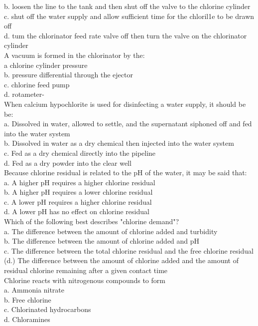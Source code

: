 b.	loosen the line to the tank and then shut off the valve to the chlorine cylinder\\
c.	shut off the water supply and allow sufficient time for the chloril1e to be drawn off\\
d.	tum the chlorinator feed rate valve off then turn the valve on the chlorinator cylinder\\
A vacuum is formed in the chlorinator by the:\\
a	chlorine cylinder pressure\\
b.	pressure differential through the ejector\\
c.	chlorine feed pump\\
d.	rotameter-\\
When calcium hypochlorite is used for disinfecting a water supply, it should be be:\\
a. Dissolved in water, allowed to settle, and the supernatant siphoned off and fed into the water system\\
b. Dissolved in water as a dry chemical then injected into the water system\\
c. Fed as a dry chemical directly into the pipeline\\
d. Fed as a dry powder into the clear well\\
Because chlorine residual is related to the pH of the water, it may be said that:\\
a. A higher pH requires a higher chlorine residual\\
b. A higher pH requires a lower chlorine residual\\
c. A lower pH requires a higher chlorine residual\\
d. A lower pH has no effect on chlorine residual\\
Which of the following best describes "chlorine demand"?\\
a. The difference between the amount of chłorine added and turbidity\\
b. The difference between the amount of chlorine added and $\mathrm{pH}$\\
c. The difference between the total chlorine residual and the free chlorine residual\\
(d.) The difference between the amount of chlorine added and the amount of residual chlorine remaining after a given contact time\\
Chlorine reacts with nitrogenous compounds to form\\
a. Ammonia nitrate\\
b. Free chlorine\\
c. Chlorinated hydrocarbons\\
d. Chloramines\\
\newpage
